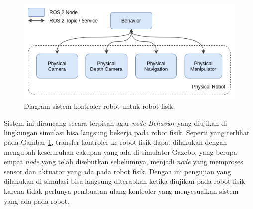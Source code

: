 \begin{figure} [ht] \centering
  \includegraphics[scale=0.45]{gambar/kontrolerfisik.png}
  \caption{Diagram sistem kontroler robot untuk robot fisik.}
  \label{fig:kontrolerfisik}
\end{figure}

Sistem ini dirancang secara terpisah agar \emph{node Behavior} yang diujikan di lingkungan simulasi bisa langsung bekerja pada robot fisik.
Seperti yang terlihat pada Gambar \ref{fig:kontrolerfisik}, transfer kontroler ke robot fisik dapat dilakukan dengan mengubah keseluruhan cakupan yang ada di simulator Gazebo, yang berupa empat \emph{node} yang telah disebutkan sebelumnya, menjadi \emph{node} yang memproses sensor dan aktuator yang ada pada robot fisik.
Dengan ini pengujian yang dilakukan di simulasi bisa langsung diterapkan ketika diujikan pada robot fisik karena tidak perlunya pembuatan ulang kontroler yang menyesuaikan sistem yang ada pada robot.
